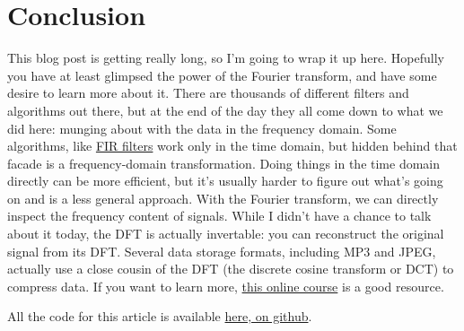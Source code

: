 \documentclass[12pt]{article}
\begin{document}
\section{Conclusion}
This blog post is getting really long,
so I'm going to wrap it up here.
Hopefully you have at least glimpsed the power of the
Fourier transform,
and have some desire to learn more about it.
There are thousands of different filters and algorithms out there,
but at the end of the day they all come down to what we did here:
munging about with the data in the frequency domain.
Some algorithms, like
\href{https://en.wikipedia.org/wiki/Finite\_impulse\_response}{FIR filters}
work only in the time domain,
but hidden behind that facade is a frequency-domain transformation.
Doing things in the time domain directly can be more efficient,
but it's usually harder to figure out what's going on
and is a less general approach.
With the Fourier transform,
we can directly inspect
the frequency content of signals.
While I didn't have a chance to talk about it today,
the DFT is actually invertable:
you can reconstruct the original
signal from its DFT.
Several data storage formats,
including MP3 and JPEG,
actually use a close cousin of the DFT
(the discrete cosine transform or DCT)
to compress data.
If you want to learn more,
\href{http://www.bores.com/courses/intro/basics/index.htm}{this online course}
is a good resource.

All the code for this article is available
\href{https://github.com/ccsf18-flow/dsp-blog}{here, on github}.
\end{document}
